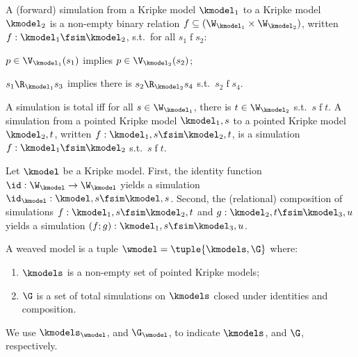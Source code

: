 {
\color{red}
\begin{definition}\label{def:simulation}
  A (forward) simulation from a Kripke model $\kmodel_1$ to a Kripke model $\kmodel_2$ is a non-empty binary relation $f \subseteq (\W_{\kmodel_1} \times \W_{\kmodel_2})$, written $f: \kmodel_1 \fsim \kmodel_2$, s.t.\ for all $s_1 \mathbin{f} s_2$:
    \begin{description}
      \setlength{\itemsep}{0pt}
      \item[\textnormal{(inclusion)}] $p \in \V_{\kmodel_1}(s_1)$ implies $p \in \V_{\kmodel_2}(s_2)$;
      \item[\textnormal{(forth)}] $s_1 \R_{\kmodel_1} s_3$ implies there is $s_2 \R_{\kmodel_2} s_4$ s.t.\ $s_2 \mathbin{f} s_4$.
    \end{description}
  A simulation is total iff for all $s \in \W_{\kmodel_1}$, there is $t \in \W_{\kmodel_2}$ s.t.\ $s \mathbin{f} t$.
  A simulation from a pointed Kripke model $\kmodel_1, s$ to a pointed Kripke model $\kmodel_2, t$, written $f: \kmodel_1,s \fsim \kmodel_2, t$, is a simulation $f: \kmodel_1 \fsim \kmodel_2$ s.t.\ $s \mathbin{f} t$.
\end{definition}

\begin{proposition}
  Let $\kmodel$ be a Kripke model.
  First, the identity function $\id: \W_{\kmodel} \to \W_{\kmodel}$ yields a simulation $\id_{\kmodel}: \kmodel,s \fsim \kmodel,s$.
  Second, the (relational) composition of simulations $f: {\kmodel_1,s \fsim \kmodel_2,t}$ and $g: {\kmodel_2,t \fsim \kmodel_3,u}$ yields a simulation $(f;g): {\kmodel_1,s \fsim \kmodel_3,u}$.
\end{proposition}

\begin{definition}\label{def:wmodel:simulation}
  A weaved model is a tuple $\wmodel = \tuple{\kmodels, \G}$ where:
  \begin{enumerate}[leftmargin=\parindent]
    \setlength{\itemsep}{0pt}
    \item $\kmodels$ is a non-empty set of pointed Kripke models;
    \item $\G$ is a set of total simulations on $\kmodels$ closed under identities and composition.
  \end{enumerate}
  We use $\kmodels_{\wmodel}$, and $\G_{\wmodel}$, to indicate $\kmodels$, and $\G$, respectively.
\end{definition}

}
